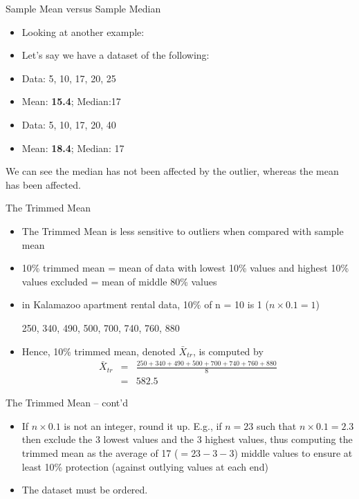 \documentclass[14pt]{beamer}\usepackage[]{graphicx}\usepackage[]{color}
\begin{document}
\begin{frame}[fragile]{Sample Mean versus Sample Median}

\begin{itemize}
\item Looking at another example:
\item Let's say we have a dataset of the following:  
\item Data: 5, 10, 17, 20, 25
\item Mean: \textbf{15.4}; Median:17
\item Data: 5, 10, 17, 20, 40
\item Mean: \textbf{18.4};  Median: 17
\end{itemize}

We can see the median has not been affected by the outlier, whereas the  mean has been affected.

\end{frame}

\begin{frame}[fragile]{The Trimmed Mean}


{\small{
\begin{itemize}
\item<1-> The Trimmed Mean is less sensitive to outliers when compared with sample mean  
\item<2-> 10\% trimmed mean = mean of data with lowest 10\% values and  highest 10\% values excluded = mean of middle 80\% values
\item<3-> in Kalamazoo apartment rental data, 10\% of n = 10 is 1 ($n \times 0.1 = 1$)

250, 340, 490, 500, 700, 740, 760, 880
\item<4-> Hence, 10\% trimmed mean, denoted $\bar{X}_{tr}$, is computed by
\begin{eqnarray*}
\bar{X}_{tr} &=& \frac{250+340+490+500+700+740+760+880}{8} \\
     &=&582.5
\end{eqnarray*}
\end{itemize}
}}
\end{frame}

\begin{frame}[fragile]{The Trimmed Mean -- cont'd}

\begin{itemize}
\item<1-> If $n \times 0.1$ is not an integer, round it up. E.g., if $n = 23$ such that  $n \times 0.1 = 2.3$ then exclude the 3 lowest values and the 3 highest values, thus computing the trimmed mean as the  average of 17 ($= 23 - 3 - 3$) middle values to ensure at least  10\% protection (against outlying values at each end)

\item<2-> The dataset must be ordered.
\end{itemize}

\end{frame}
\end{document}

